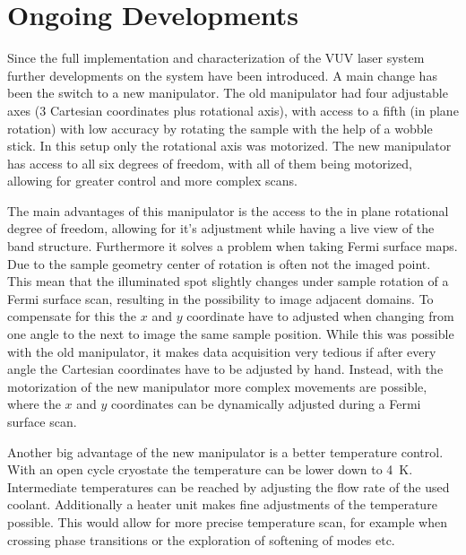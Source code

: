 

\section{Ongoing Developments}

Since the full implementation and characterization of the VUV laser system further developments on the system have been introduced.
A main change has been the switch to a new manipulator.
The old manipulator had four adjustable axes (3 Cartesian coordinates plus rotational axis), with access to a fifth (in plane rotation) with low accuracy by rotating the sample with the help of a wobble stick.
In this setup only the rotational axis was motorized.
The new manipulator has access to all six degrees of freedom, with all of them being motorized, allowing for greater control and more complex scans.

The main advantages of this manipulator is the access to the in plane rotational degree of freedom, allowing for it's adjustment while having a live view of the band structure.
Furthermore it solves a problem when taking Fermi surface maps.
Due to the sample geometry center of rotation is often not the imaged point.
This mean that the illuminated spot slightly changes under sample rotation of a Fermi surface scan, resulting in the possibility to image adjacent domains.
To compensate for this the $x$ and $y$ coordinate have to adjusted when changing from one angle to the next to image the same sample position.
While this was possible with the old manipulator, it makes data acquisition very tedious if after every angle the Cartesian coordinates have to be adjusted by hand.
Instead, with the motorization of the new manipulator more complex movements are possible, where the $x$ and $y$ coordinates can be dynamically adjusted during a Fermi surface scan.

Another big advantage of the new manipulator is a better temperature control.
With an open cycle cryostate the temperature can be lower down to \qty{4}{\kelvin}.
Intermediate temperatures can be reached by adjusting the flow rate of the used coolant.
Additionally a heater unit makes fine adjustments of the temperature possible.
This would allow for more precise temperature scan, for example when crossing phase transitions or the exploration of softening of modes etc.


